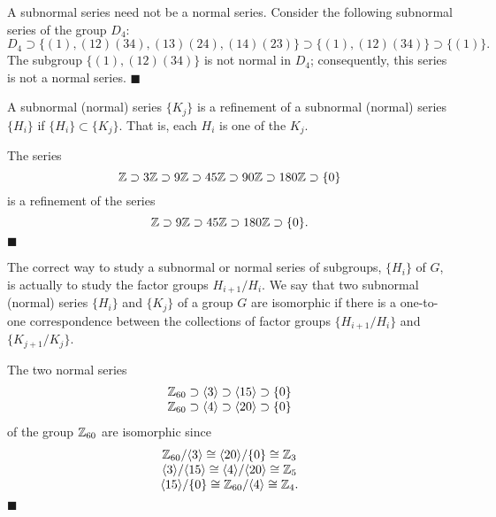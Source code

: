  
\vspace{2ex}
 
 
A subnormal series need not be a normal series.  Consider the
following subnormal series of the group $D_4$: 
\[
D_4 \supset \{ (1),
(12)(34), (13)(24), (14)(23) \} \supset  \{  (1), (12)(34) \} 
\supset \{ (1) \}.
\]
The subgroup $\{  (1), (12)(34) \}$ is not normal in $D_4$;
consequently, this series is not a normal series.
\hspace{\fill} $\blacksquare$
 
 
\vspace{2ex}
 
 
A subnormal (normal) series $\{ K_j \}$ is a {\bfi refinement of a
subnormal (normal) series\/} $\{ H_i \}$ if $\{ H_i \} \subset \{ K_j
\}$. That is, each $H_i$ is one of the $K_j$. 
 
 
\vspace{2ex}
 
 
The series
\[
{\Bbb Z} \supset 3{\Bbb Z} \supset 9{\Bbb Z} \supset 45{\Bbb Z}
\supset 90{\Bbb Z} \supset 180{\Bbb Z} \supset \{0\}
\]
is a refinement of the series
\[
{\Bbb Z} \supset 9{\Bbb Z} \supset 45{\Bbb Z} \supset 180{\Bbb Z} 
\supset \{0\}.
\]
\hspace{\fill} $\blacksquare$
 
 
\vspace{2ex}
 
 
The correct way to study a subnormal or normal series of subgroups,
$\{ H_i \}$ of $G$, is actually to study the factor groups
$H_{i+1}/H_i$.  We say that two subnormal (normal) series $\{H_i \}$
and $\{ K_j \}$ of a group $G$ are {\bfi isomorphic\/} if there is a
one-to-one correspondence between the collections of factor groups
$\{H_{i+1}/H_i \}$ and $\{ K_{j+1}/ K_j \}$. 
 
 
\vspace{2ex}
 
 
The two normal series
\[
\begin{array}{c}
{\Bbb Z}_{60} \supset \langle 3 \rangle \supset  \langle 15 \rangle
\supset \{ 0 \} \\
{\Bbb Z}_{60} \supset \langle 4 \rangle \supset  \langle 20 \rangle
\supset \{ 0 \}
\end{array}
\]
of the group ${\Bbb Z}_{60}$ are isomorphic since
\[
\begin{array}{c}
{\Bbb Z}_{60} / \langle 3 \rangle \cong \langle 20 \rangle /
\{ 0 \} \cong {\Bbb Z}_{3}
\\
\langle 3 \rangle / \langle 15 \rangle
\cong \langle 4 \rangle /  \langle 20 \rangle \cong {\Bbb Z}_{5}
\\
\langle 15 \rangle / \{ 0 \} \cong {\Bbb Z}_{60} / \langle 4 \rangle
\cong {\Bbb Z}_4.
\end{array}
\]
\hspace{\fill} $\blacksquare$
 
